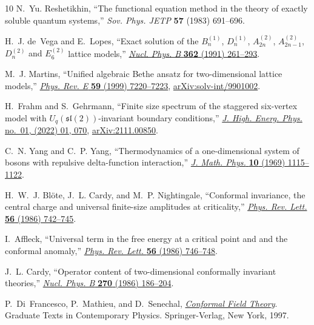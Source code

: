 \documentclass[12pt]{article}
\numberwithin{equation}{section}
\begin{document}
\begin{thebibliography}{10}
		N.~{\relax Yu}. Reshetikhin, ``{The functional equation method in the theory of
			exactly soluble quantum systems},'' {\em Sov. Phys. JETP} {\bfseries 57}
		(1983) 691--696.
		
		H.~J. de~Vega and E.~Lopes, ``Exact solution of the {$B_n^{(1)}$, $D_n^{(1)}$,
			$A_{2n}^{(2)}$, $A_{2n-1}^{(2)}$, $D_n^{(2)}$ and $E_6^{(2)}$} lattice
		models,'' \href{http://dx.doi.org/10.1016/0550-3213(91)90564-E}{{\em Nucl.
				Phys. B} {\bfseries 362} (1991) 261--293}.
		
		M.~J. Martins, ``{U}nified algebraic {Bethe} ansatz for two-dimensional lattice
		models,'' \href{http://dx.doi.org/10.1103/PhysRevE.59.7220}{{\em Phys. Rev.
				E} {\bfseries 59} (1999) 7220--7223},
		\href{http://arxiv.org/abs/solv-int/9901002}{{\ttfamily
				arXiv:solv-int/9901002}}.
		
		H.~Frahm and S.~Gehrmann, ``Finite size spectrum of the staggered six-vertex
		model with {$U_q(\mathfrak{sl}(2))$}-invariant boundary conditions,''
		\href{http://dx.doi.org/10.1007/JHEP01(2022)070}{{\em J. High. Energ. Phys.}
			no.~01, (2022) 01, 070}, \href{http://arxiv.org/abs/2111.00850}{{\ttfamily
				arXiv:2111.00850}}.
		
		C.~N. Yang and C.~P. Yang, ``{T}hermodynamics of a one-dimensional system of
		bosons with repulsive delta-function interaction,''
		\href{http://dx.doi.org/10.1063/1.1664947}{{\em J. Math. Phys.} {\bfseries
				10} (1969) 1115--1122}.
		
		H.~W.~J. Bl{\"o}te, J.~L. Cardy, and M.~P. Nightingale, ``{C}onformal
		invariance, the central charge and universal finite-size amplitudes at
		criticality,'' \href{http://dx.doi.org/10.1103/PhysRevLett.56.742}{{\em Phys.
				Rev. Lett.} {\bfseries 56} (1986) 742--745}.
		
		I.~Affleck, ``{U}niversal term in the free energy at a critical point and and
		the conformal anomaly,''
		\href{http://dx.doi.org/10.1103/physrevlett.56.746}{{\em Phys. Rev. Lett.}
			{\bfseries 56} (1986) 746--748}.
		
		J.~L. Cardy, ``{O}perator content of two-dimensional conformally invariant
		theories,''
		\href{http://dx.doi.org/https://doi.org/10.1016/0550-3213(86)90552-3}{{\em
				Nucl. Phys. B} {\bfseries 270} (1986) 186--204}.
		
		P.~Di~Francesco, P.~Mathieu, and D.~Senechal,
		\href{http://dx.doi.org/10.1007/978-1-4612-2256-9}{{\em {Conformal Field
					Theory}}}.
		\newblock Graduate Texts in Contemporary Physics. Springer-Verlag, New York,
		1997.
		

\end{thebibliography}
\end{document}

